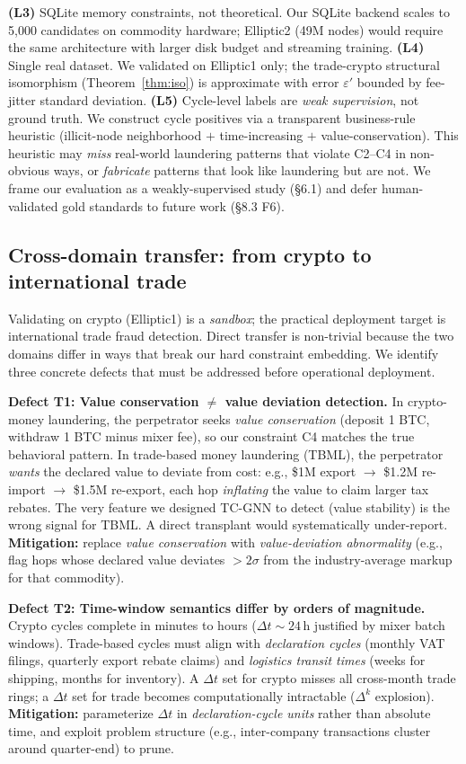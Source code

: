 \documentclass[journal,onecolumn]{IEEEtran}
\newcommand{\eps}{\varepsilon}
\begin{document}
\textbf{(L3)} SQLite memory constraints, not theoretical.
Our SQLite backend scales to 5{,}000 candidates on commodity hardware;
Elliptic2 (49M nodes) would require the same architecture with larger
disk budget and streaming training. \textbf{(L4)} Single real dataset.
We validated on Elliptic1 only; the trade-crypto structural isomorphism
(Theorem~\ref{thm:iso}) is approximate with error $\eps'$ bounded by
fee-jitter standard deviation. \textbf{(L5)} Cycle-level labels are
\emph{weak supervision}, not ground truth. We construct cycle
positives via a transparent business-rule heuristic (illicit-node
neighborhood $+$ time-increasing $+$ value-conservation). This
heuristic may \emph{miss} real-world laundering patterns that violate
C2--C4 in non-obvious ways, or \emph{fabricate} patterns that look
like laundering but are not. We frame our evaluation as a
weakly-supervised study (§6.1) and defer human-validated gold
standards to future work (§8.3 F6).

\subsection{Cross-domain transfer: from crypto to international trade}
\label{sec:transfer}

Validating on crypto (Elliptic1) is a \emph{sandbox}; the practical
deployment target is international trade fraud detection. Direct
transfer is non-trivial because the two domains differ in ways that
break our hard constraint embedding. We identify three concrete
defects that must be addressed before operational deployment.

\textbf{Defect T1: Value conservation $\neq$ value deviation detection.}
In crypto-money laundering, the perpetrator seeks \emph{value
conservation} (deposit 1 BTC, withdraw 1 BTC minus mixer fee), so our
constraint C4 matches the true behavioral pattern. In trade-based
money laundering (TBML), the perpetrator \emph{wants} the declared
value to deviate from cost: e.g., \$1M export $\to$ \$1.2M re-import
$\to$ \$1.5M re-export, each hop \emph{inflating} the value to claim
larger tax rebates. The very feature we designed TC-GNN to detect
(value stability) is the wrong signal for TBML. A direct transplant
would systematically under-report. \textbf{Mitigation:} replace
\emph{value conservation} with \emph{value-deviation abnormality} (e.g.,
flag hops whose declared value deviates $> 2\sigma$ from the
industry-average markup for that commodity).

\textbf{Defect T2: Time-window semantics differ by orders of magnitude.}
Crypto cycles complete in minutes to hours ($\Delta t \sim 24$\,h
justified by mixer batch windows). Trade-based cycles must align with
\emph{declaration cycles} (monthly VAT filings, quarterly export
rebate claims) and \emph{logistics transit times} (weeks for shipping,
months for inventory). A $\Delta t$ set for crypto misses all
cross-month trade rings; a $\Delta t$ set for trade becomes
computationally intractable ($\Delta^k$ explosion). \textbf{Mitigation:}
parameterize $\Delta t$ in \emph{declaration-cycle units} rather than
absolute time, and exploit problem structure (e.g., inter-company
transactions cluster around quarter-end) to prune.
\end{document}
